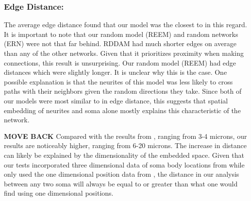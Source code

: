 \subsubsection{Edge Distance:} 

The average edge distance found that our model was the closest to \ce in this regard. 
It is important to note that our random model (REEM) and random networks (ERN) were not that far behind. 
RDDAM had much shorter edges on average than any of the other networks. 
Given that it prioritizes proximity when making connections, this result is unsurprising. 
Our random model (REEM) had edge distances which were slightly longer. 
It is unclear why this is the case. 
One possible explanation is that the neurites of this model was less likely to cross paths with their neighbors given the random directions they take.
Since both of our models were most similar to \ce in edge distance, this suggests that spatial embedding of neurites and soma alone mostly explains this characteristic of the network. 

\textbf{MOVE BACK}
Compared with the results from \cite{Itzhack}, ranging from 3-4 microns, our results are noticeably higher, ranging from 6-20 microns. 
The increase in distance can likely be explained by the dimensionality of the embedded space. 
Given that our tests incorporated three dimensional data of soma body locations from \cite{Skuhersky} while \cite{Itzhack} only used the one dimensional position data from \cite{WormAtlas2009}, the distance in our analysis between any two soma will always be equal to or greater than what one would find using one dimensional positions.

